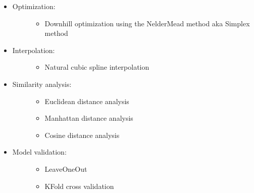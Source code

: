 \documentclass[letterpaper,10pt,english]{sphinxmanual}
\begin{document}
\begin{itemize}
\begin{description}
\end{description}

\item {} \begin{description}
\item[{Optimization:}] \leavevmode\begin{itemize}
\item {} 
\sphinxAtStartPar
Downhill optimization using the Nelder\textendash{}Mead method aka Simplex method

\end{itemize}

\end{description}

\item {} \begin{description}
\item[{Interpolation:}] \leavevmode\begin{itemize}
\item {} 
\sphinxAtStartPar
Natural cubic spline interpolation

\end{itemize}

\end{description}

\item {} \begin{description}
\item[{Similarity analysis:}] \leavevmode\begin{itemize}
\item {} 
\sphinxAtStartPar
Euclidean distance analysis

\item {} 
\sphinxAtStartPar
Manhattan distance analysis

\item {} 
\sphinxAtStartPar
Cosine distance analysis

\end{itemize}

\end{description}

\item {} \begin{description}
\item[{Model validation:}] \leavevmode\begin{itemize}
\item {} 
\sphinxAtStartPar
Leave\sphinxhyphen{}One\sphinxhyphen{}Out

\item {} 
\sphinxAtStartPar
K\sphinxhyphen{}Fold cross validation


\end{itemize}
\end{description}
\end{itemize}
\end{document}
